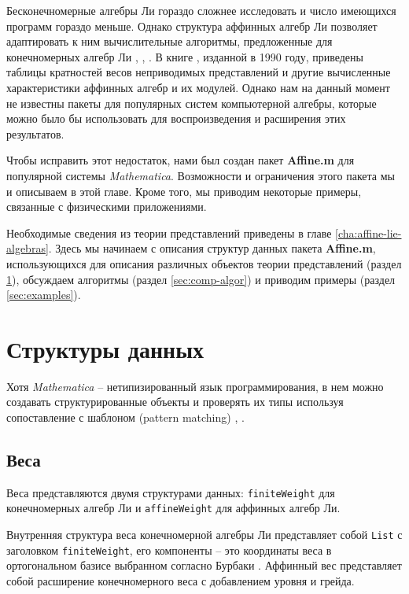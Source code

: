 Бесконечномерные алгебры Ли гораздо сложнее исследовать и число имеющихся программ гораздо меньше. 
Однако структура аффинных алгебр Ли позволяет адаптировать к ним вычислительные алгоритмы, предложенные для конечномерных алгебр Ли \cite{Fuchs:1996dd}, \cite{gannon2001algorithms}, \cite{kass1990ala}. В книге \cite{kass1990ala}, изданной в 1990 году, приведены таблицы кратностей весов неприводимых представлений и другие вычисленные характеристики аффинных алгебр и их модулей. Однако нам на данный момент не известны пакеты для популярных систем компьютерной алгебры, которые можно было бы использовать для воспроизведения и расширения этих результатов.

Чтобы исправить этот недостаток, нами был создан пакет {\bf Affine.m} для популярной системы  {\it Mathematica}. Возможности и ограничения этого пакета мы и описываем в этой главе. Кроме того, мы приводим некоторые примеры, связанные с физическими приложениями. 

Необходимые сведения из теории представлений приведены в главе \ref{cha:affine-lie-algebras}. Здесь мы начинаем с описания структур данных пакета  {\bf Affine.m}, использующихся для описания различных объектов теории представлений  (раздел \ref{sec:core-datastructures}), обсуждаем алгоритмы  (раздел \ref{sec:comp-algor}) и приводим примеры  (раздел \ref{sec:examples}). 

\section{Структуры данных}
\label{sec:core-datastructures} 
Хотя {\it Mathematica} -- нетипизированный язык программирования, в нем можно создавать структурированные объекты и проверять их типы используя сопоставление с шаблоном (pattern matching) \cite{shifrinmathematica}, \cite{maeder2000computer}.
\subsection{Веса}
\label{sec:weights}

Веса представляются двумя структурами данных: \lstinline{finiteWeight} для конечномерных алгебр Ли и \lstinline{affineWeight} для аффинных алгебр Ли.

Внутренняя структура веса конечномерной алгебры Ли представляет собой  \lstinline{List} с заголовком \lstinline{finiteWeight}, его компоненты -- это координаты веса в ортогональном базисе выбранном согласно Бурбаки \cite{bourbaki2002lie}.
Аффинный вес представляет собой расширение конечномерного веса с добавлением уровня и грейда. 

